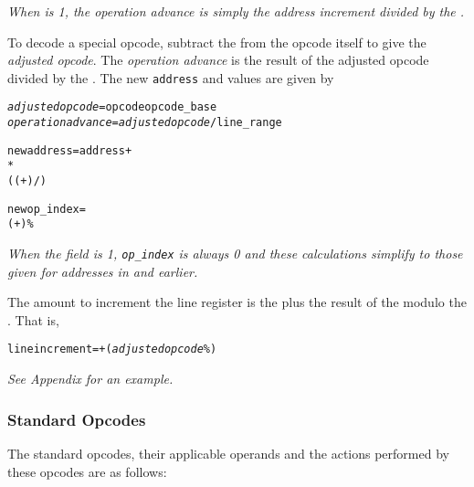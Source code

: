 \textit{When  is 1, 
the operation advance is simply the address increment divided by the
.}

To decode a special opcode, subtract the  from
the opcode itself to give the \textit{adjusted opcode}. 
The \textit{operation advance} 
is the result of the adjusted opcode divided by the
. The new \texttt{address} and 
 values are given by
\begin{alltt}
  \textit{adjusted opcode} = opcode \dash opcode\_base
  \textit{operation advance} = \textit{adjusted opcode} / line\_range

  new address = address +
     *
      (( + ) / )

  new op\_index =
    ( + ) \% 
\end{alltt}

\textit{When the  
field is 1,
\texttt{op\_index} is always 0 and these calculations simplify to 
those given for addresses in \DWARFVersionIII{} and earlier.}

The amount to increment the line register is the 
 plus
the result of the 
\textit{} modulo the 
. That
is,

\begin{alltt}
  line increment =  + (\textit{adjusted opcode} \% )
\end{alltt}

\textit{See Appendix  for an example.}


\subsubsection{Standard Opcodes}
\label{chap:standardopcodes}

The standard opcodes, their applicable operands and the
actions performed by these opcodes are as follows:

